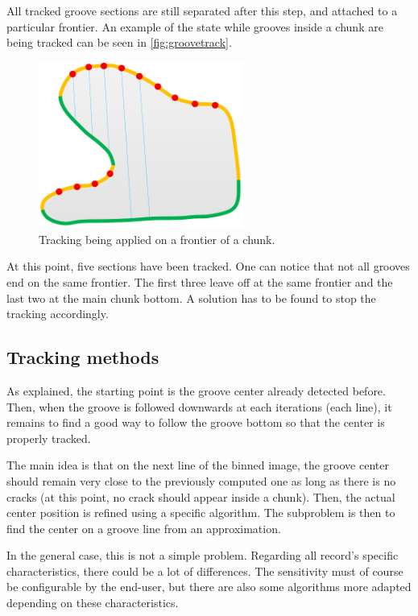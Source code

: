 All tracked groove sections are still separated after this step, and attached to a particular frontier. An example of the state while grooves inside a chunk are being tracked can be seen in \autoref{fig:groovetrack}.

\begin{figure}[!ht]
\centering
\includegraphics[width=0.6\textwidth]{images/chunk-tracking}
\caption{Tracking being applied on a frontier of a chunk.}
\label{fig:groovetrack}
\end{figure}

At this point, five sections have been tracked. One can notice that not all grooves end on the same frontier. The first three leave off at the same frontier and the last two at the main chunk bottom. A solution has to be found to stop the tracking accordingly.

\subsection{Tracking methods}

As explained, the starting point is the groove center already detected before. Then, when the groove is followed downwards at each iterations (each line), it remains to find a good way to follow the groove bottom so that the center is properly tracked.

The main idea is that on the next line of the binned image, the groove center should remain very close to the previously computed one as long as there is no cracks (at this point, no crack should appear inside a chunk). Then, the actual center position is refined using a specific algorithm. The subproblem is then to find the center on a groove line from an approximation.

In the general case, this is not a simple problem. Regarding all record's specific characteristics, there could be a lot of differences. The sensitivity must of course be configurable by the end-user, but there are also some algorithms more adapted depending on these characteristics.

